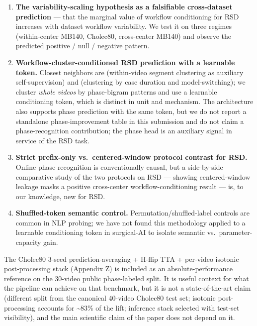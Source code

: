 \begin{enumerate}
\def\labelenumi{\arabic{enumi}.}
\tightlist
\item
  \textbf{The variability-scaling hypothesis as a falsifiable
  cross-dataset prediction} --- that the marginal value of workflow
  conditioning for RSD increases with dataset workflow variability. We
  test it on three regimes (within-center MB140, Cholec80, cross-center
  MB140) and observe the predicted positive / null / negative pattern.
\item
  \textbf{Workflow-cluster-conditioned RSD prediction with a learnable
  token.} Closest neighbors are \citet{yengera2019unsupervised} (within-video
  segment clustering as auxiliary self-supervision) and \citet{kostopoulos2025prediction} (clustering by case duration and model-switching); we
  cluster \emph{whole videos} by phase-bigram patterns and use a
  learnable conditioning token, which is distinct in unit and mechanism.
  The architecture also supports phase prediction with the same token,
  but we do not report a standalone phase-improvement table in this
  submission and do not claim a phase-recognition contribution; the
  phase head is an auxiliary signal in service of the RSD task.
\item
  \textbf{Strict prefix-only vs.~centered-window protocol contrast for
  RSD.} Online phase recognition is conventionally causal, but a
  side-by-side comparative study of the two protocols on RSD --- showing
  centered-window leakage masks a positive cross-center
  workflow-conditioning result --- is, to our knowledge, new for RSD.
\item
  \textbf{Shuffled-token semantic control.} Permutation/shuffled-label
  controls are common in NLP probing; we have not found this methodology
  applied to a learnable conditioning token in surgical-AI to isolate
  semantic vs.~parameter-capacity gain.
\end{enumerate}

The Cholec80 3-seed prediction-averaging + H-flip TTA + per-video
isotonic post-processing stack (Appendix Z) is included as an
absolute-performance reference on the 30-video public phase-labeled
split. It is useful context for what the pipeline can achieve on that
benchmark, but it is not a state-of-the-art claim (different split from
the canonical 40-video Cholec80 test set; isotonic post-processing
accounts for \textasciitilde83\% of the lift; inference stack selected
with test-set visibility), and the main scientific claim of the paper
does not depend on it.

